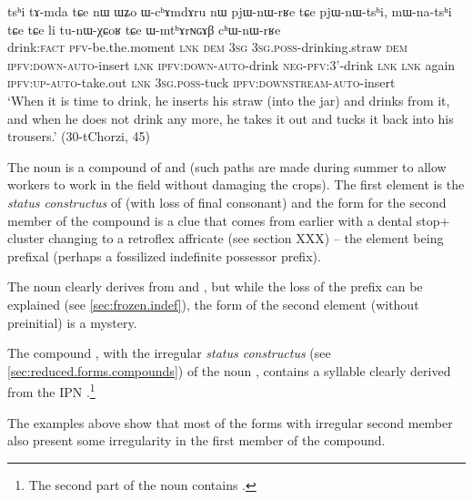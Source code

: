 \begin{exe}
\ex \label{ex:WmthArNGAB}
\gll tsʰi tɤ-mda tɕe nɯ ɯʑo ɯ-cʰɤmdɤru nɯ pjɯ-nɯ-rʁe tɕe pjɯ-nɯ-tsʰi, mɯ-na-tsʰi tɕe tɕe li tu-nɯ-χɕoʁ tɕe ɯ-mtʰɤrɴɢɤβ cʰɯ-nɯ-rʁe \\
drink:\textsc{fact} \textsc{pfv}-be.the.moment \textsc{lnk} \textsc{dem} \textsc{3sg} \textsc{3sg.poss}-drinking.straw \textsc{dem} \textsc{ipfv}:\textsc{down}-\textsc{auto}-insert \textsc{lnk} \textsc{ipfv}:\textsc{down}-\textsc{auto}-drink \textsc{neg}-\textsc{pfv}:3'-drink \textsc{lnk} \textsc{lnk} again \textsc{ipfv}:\textsc{up}-\textsc{auto}-take.out \textsc{lnk} \textsc{3sg.poss}-tuck \textsc{ipfv}:\textsc{downstream}-\textsc{auto}-insert \\
\glt `When it is time to drink, he inserts his straw (into the jar) and drinks from it, and when he does not drink any more, he takes it out and tucks it back into his trousers.' (30-tChorzi, 45)
\end{exe}

The noun  is a compound of  and  (such paths are made during summer to allow workers to work in the field without damaging the crops). The first element  is the \textit{status constructus} of  (with loss of final consonant) and the form  for the second member of the compound is a clue that  comes from earlier  with a dental stop+ cluster changing to a retroflex affricate (see section XXX) -- the  element being prefixal (perhaps a fossilized indefinite possessor prefix).

The noun  clearly derives from  and , but while the loss of the  prefix can be explained (see \ref{sec:frozen.indef}), the form of the second element (without  preinitial) is a mystery.
 
 The compound , with the irregular \textit{status constructus}  (see \ref{sec:reduced.forms.compounds}) of the noun , contains a syllable   clearly derived from the IPN .\footnote{The second part of the noun  contains . }  
 
The examples above show that most of the forms with irregular second member also present some irregularity in the first member of the compound. 

